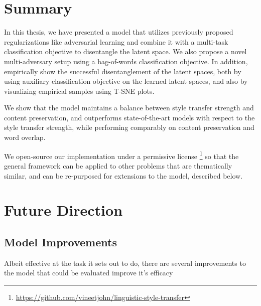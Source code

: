 \section{Summary}

In this thesis, we have presented a model that utilizes previously proposed regularizations like adversarial learning and combine it with a multi-task classification objective to disentangle the latent space. We also propose a novel multi-adversary setup using a bag-of-words classification objective. In addition,  empirically show the successful disentanglement of the latent spaces, both by using auxiliary classification objective on the learned latent spaces, and also by visualizing empirical samples using T-SNE plots.

We show that the model maintains a balance between style transfer strength and content preservation, and outperforms state-of-the-art models with respect to the style transfer strength, while performing comparably on content preservation and word overlap.

We open-source our implementation under a permissive license \footnote{\url{https://github.com/vineetjohn/linguistic-style-transfer}} so that the general framework can be applied to other problems that are thematically similar, and can be re-purposed for extensions to the model, described below.


\section{Future Direction}

\subsection{Model Improvements}

Albeit effective at the task it sets out to do, there are several improvements to the model that could be evaluated improve it's efficacy

